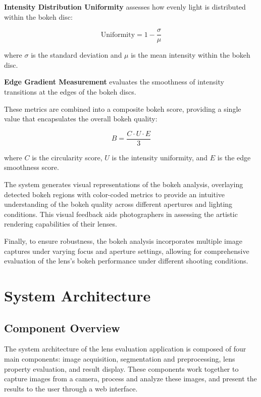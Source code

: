 \textbf{Intensity Distribution Uniformity} assesses how evenly light is distributed within the bokeh disc:

\begin{equation}
\text{Uniformity} = 1 - \frac{\sigma}{\mu}
\end{equation}

where \( \sigma \) is the standard deviation and \( \mu \) is the mean intensity within the bokeh disc.

\textbf{Edge Gradient Measurement} evaluates the smoothness of intensity transitions at the edges of the bokeh discs.

These metrics are combined into a composite bokeh score, providing a single value that encapsulates the overall bokeh quality:

\begin{equation}
B = \frac{C \cdot U \cdot E}{3}
\end{equation}

where \( C \) is the circularity score, \( U \) is the intensity uniformity, and \( E \) is the edge smoothness score.

The system generates visual representations of the bokeh analysis, overlaying detected bokeh regions with color-coded metrics to provide an intuitive understanding of the bokeh quality across different apertures and lighting conditions. This visual feedback aids photographers in assessing the artistic rendering capabilities of their lenses.

Finally, to ensure robustness, the bokeh analysis incorporates multiple image captures under varying focus and aperture settings, allowing for comprehensive evaluation of the lens's bokeh performance under different shooting conditions.

\section{System Architecture}

\subsection{Component Overview}
The system architecture of the lens evaluation application is composed of four main components: image acquisition, segmentation and preprocessing, lens property evaluation, and result display. These components work together to capture images from a camera, process and analyze these images, and present the results to the user through a web interface.

